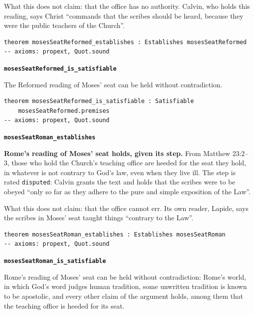 \documentclass[11pt]{article}
\begin{document}
What this does not claim: that the office has no authority. Calvin, who holds this reading, says Christ “commands that the scribes should be heard, because they were the public teachers of the Church”.

{\small\begin{verbatim}
theorem mosesSeatReformed_establishes : Establishes mosesSeatReformed
-- axioms: propext, Quot.sound
\end{verbatim}}
\par\medskip\noindent\textbf{\texttt{moses\allowbreak{}Seat\allowbreak{}Reformed\_\allowbreak{}is\_\allowbreak{}satisfiable}}\par\nobreak\noindent
The Reformed reading of Moses’ seat can be held without contradiction.

{\small\begin{verbatim}
theorem mosesSeatReformed_is_satisfiable : Satisfiable
    mosesSeatReformed.premises
-- axioms: propext, Quot.sound
\end{verbatim}}
\par\medskip\noindent\textbf{\texttt{moses\allowbreak{}Seat\allowbreak{}Roman\_\allowbreak{}establishes}}\par\nobreak\noindent
\textbf{Rome’s reading of Moses’ seat holds, given its step.} From Matthew 23:2–3, those who hold the Church’s teaching office are heeded for the seat they hold, in whatever is not contrary to God’s law, even when they live ill. The step is rated \texttt{disputed}: Calvin grants the text and holds that the scribes were to be obeyed “only so far as they adhere to the pure and simple exposition of the Law”.

What this does not claim: that the office cannot err. Its own reader, Lapide, says the scribes in Moses’ seat taught things “contrary to the Law”.

{\small\begin{verbatim}
theorem mosesSeatRoman_establishes : Establishes mosesSeatRoman
-- axioms: propext, Quot.sound
\end{verbatim}}
\par\medskip\noindent\textbf{\texttt{moses\allowbreak{}Seat\allowbreak{}Roman\_\allowbreak{}is\_\allowbreak{}satisfiable}}\par\nobreak\noindent
Rome’s reading of Moses’ seat can be held without contradiction: Rome’s world, in which God’s word judges human tradition, some unwritten tradition is known to be apostolic, and every other claim of the argument holds, among them that the teaching office is heeded for its seat.
\end{document}
